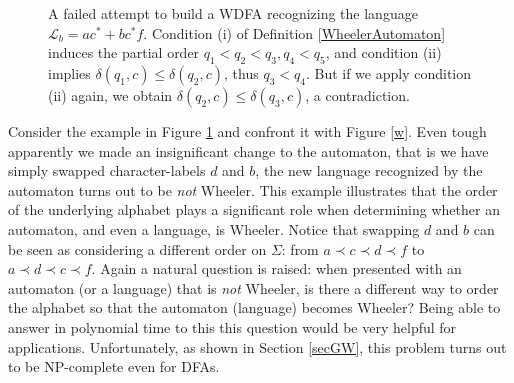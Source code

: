\documentclass[runningheads]{llncs}
\begin{document}
\begin{figure}[ht!]%
\begin{center}
\end{center}
    \caption{A failed attempt to build a WDFA recognizing the language $\mathcal L_b = ac^*+bc^*f$. Condition (i) of Definition \ref{WheelerAutomaton} induces the partial order $q_1 < q_2 < q_3,q_4 < q_5$, and condition (ii) implies $\delta(q_1, c) \le \delta(q_2, c)$, thus $q_3 < q_4$. But if we apply condition (ii) again, we obtain $\delta(q_2, c) \le \delta(q_3, c)$, a contradiction.}%
    \label{nw}%
\end{figure}

Consider  the example in Figure \ref{nw} and confront it with Figure \ref{w}. 
Even tough apparently we made an insignificant change to the automaton, that is we have simply swapped character-labels $d$ and $b$, the new language recognized by the automaton turns out to be \emph{not} Wheeler. This example illustrates that the order of the underlying alphabet plays a significant role when determining whether an automaton, and even a language, is Wheeler. Notice that swapping $d$ and $b$ can be seen as considering a different order on $\Sigma$: from $a \prec c \prec d \prec f$ to $a \prec d \prec c \prec f$. Again a  natural question is raised: when presented with an automaton (or a language) that is \emph{not} Wheeler, is there a different way to order the alphabet so that the automaton (language) becomes Wheeler? Being able to answer in polynomial time to this this question would be very helpful for applications. Unfortunately, as shown in Section \ref{secGW}, this problem turns out to be NP-complete even for DFAs. 
\end{document}
